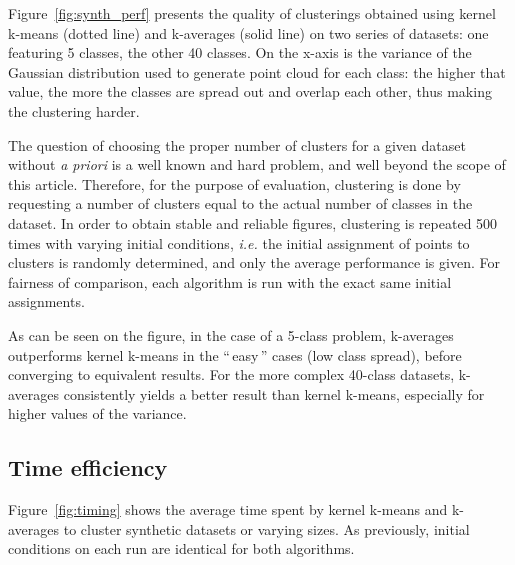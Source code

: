 \documentclass[a4paper,twoside]{article}
\newcommand{\gl}[1]{``\,#1\,''} %
\begin{document}
Figure~\ref{fig:synth_perf} presents the quality of clusterings obtained using kernel k-means (dotted line) and k-averages (solid line) on two series of datasets: one featuring 5 classes, the other 40 classes. On the x-axis is the variance of the Gaussian distribution used to generate point cloud for each class: the higher that value, the more the classes are spread out and overlap each other, thus making the clustering harder.

The question of choosing the proper number of clusters for a given dataset without \textit{a priori} is a well known and hard problem, and well beyond the scope of this article. Therefore, for the purpose of evaluation, clustering is done by requesting a number of clusters equal to the actual number of classes in the dataset. In order to obtain stable and reliable figures, clustering is repeated 500 times with varying initial conditions, \textit{i.e.} the initial assignment of points to clusters is randomly determined, and only the average performance is given. For fairness of comparison, each algorithm is run with the exact same initial assignments.

As can be seen on the figure, in the case of a 5-class problem, k-averages outperforms kernel k-means in the \gl{easy} cases (low class spread), before converging to equivalent results. For the more complex 40-class datasets, k-averages consistently yields a better result than kernel k-means, especially for higher values of the variance.

\subsection{Time efficiency}

Figure~\ref{fig:timing} shows the average time spent by kernel k-means and k-averages to cluster synthetic datasets or varying sizes. As previously, initial conditions on each run are identical for both algorithms.
\end{document}
